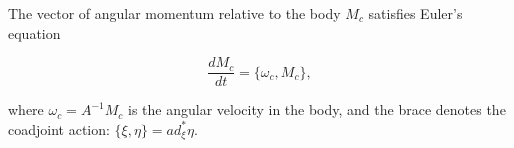 The vector of angular momentum relative to the body $M_c$ satisfies Euler's equation

$$\frac{dM_c}{dt} = \{\omega_c, M_c\},$$

where $\omega_c = A^{-1}M_c$ is the angular velocity in the body, and the brace denotes the coadjoint action: $\{\xi, \eta\} = ad^*_\xi \eta$.

